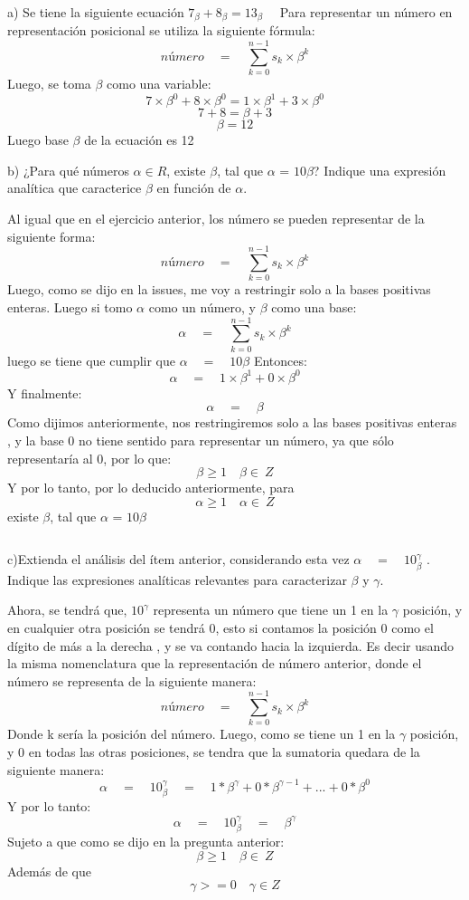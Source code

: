 \documentclass[letter]{article}
\begin{document}
	
	\begin{pregunta}{1} %
		a) Se tiene la siguiente ecuación $7_{\beta}+8_{\beta}=13_{\beta}\quad$ Para representar un número en representación posicional se utiliza la siguiente fórmula: $$número\quad=\quad\sum^{n-1}_{k=0}s_{k} \times \beta^{k}$$
		Luego, se toma $\beta$ como una variable:
		$$7\times\beta^{0}+8\times\beta^{0} = 1\times\beta^{1} + 3\times\beta^{0}$$ 
		$$7+8=\beta + 3$$
		$$\beta = 12$$
		Luego base $\beta$ de la ecuación es 12

	$$\quad$$
	$$\quad$$
		b) ¿Para qué números $\alpha\in R$, existe $\beta$, tal que $\alpha$ = $10\beta$? Indique una expresión analítica que caracterice $\beta$ en función de $\alpha$.
		$$\quad$$
		
		Al igual que en el ejercicio anterior, los número se pueden representar de la siguiente forma: 
		$$número\quad=\quad\sum^{n-1}_{k=0}s_{k} \times \beta^{k}$$
		Luego, como se dijo en la issues, me voy a restringir solo a la bases positivas enteras. Luego si tomo $\alpha$ como un número, y $\beta$ como una base:
		$$\alpha\quad=\quad\sum^{n-1}_{k=0}s_{k} \times \beta^{k}$$
		luego se tiene que cumplir que $\alpha\quad=\quad10\beta$
		Entonces:
		$$\alpha\quad=\quad 1\times\beta^{1} + 0\times\beta^{0}$$
		Y finalmente:
		$$\alpha\quad=\quad\beta$$
		Como dijimos anteriormente, nos restringiremos solo a las bases positivas enteras , y la base 0 no tiene sentido para representar un número, ya que sólo representaría al 0, por lo que:
		$$\beta\geq 1 \quad \beta\in\ Z$$
		Y por lo tanto, por lo deducido anteriormente,  para $$\alpha\geq 1 \quad \alpha\in\ Z$$ existe  $\beta$, tal que $\alpha$ = $10\beta$
		
		$$\quad$$
		$$\quad$$


		c)Extienda el análisis del ítem anterior, considerando esta vez $\alpha\quad=\quad 10_{\beta}^{\gamma}$
. Indique las expresiones analíticas relevantes para caracterizar $\beta$ y $\gamma$.
$$\quad$$

Ahora, se tendrá que, $10^{\gamma}$ representa un número que tiene un 1 en la $\gamma$ posición, y en cualquier otra posición se tendrá 0, esto si contamos la posición 0 como el dígito de más a la derecha , y se va contando hacia la izquierda. Es decir usando la misma nomenclatura que la representación de número anterior, donde el número se representa de la siguiente manera:
$$número\quad=\quad\sum^{n-1}_{k=0}s_{k} \times \beta^{k}$$
Donde k sería la posición del número. Luego, como se tiene un 1 en la $\gamma$ posición, y 0 en todas las otras posiciones, se tendra que la sumatoria quedara de la siguiente manera:
$$\alpha\quad=\quad 10_{\beta}^{\gamma}\quad=\quad1*\beta^{\gamma}+0*\beta^{\gamma-1}+...+0*\beta^{0}$$
Y por lo tanto:
$$  \alpha\quad=\quad 10_{\beta}^{\gamma}\quad=\quad\beta^{\gamma}  $$
Sujeto a que como se dijo en la pregunta anterior:
$$\beta\geq 1 \quad \beta\in\ Z$$
Además de que $$\gamma >= 0 \quad \gamma\in Z$$

		
		
	\end{pregunta}
	
\end{document}
